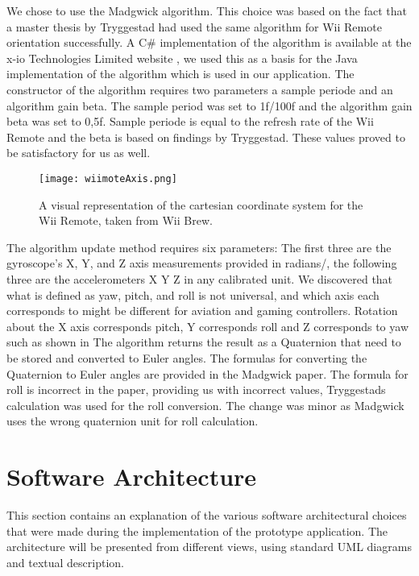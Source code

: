 We chose to use the Madgwick algorithm\cite{madgwick}. This choice was based on the fact that a master thesis by Tryggestad\cite{Tryggestad} had used the same algorithm for Wii Remote orientation successfully. A C\# implementation of the algorithm is available at the x-io Technologies Limited website \cite{opensourceMadgwick}, we used this as a basis for the Java implementation of the algorithm which is used in our application. The constructor of the algorithm requires two parameters a sample periode and an algorithm gain beta. The sample period was set to 1f/100f and the algorithm gain beta was set to 0,5f. Sample periode is equal to the refresh rate of the Wii Remote and the beta is based on findings by Tryggestad. These values proved to be satisfactory for us as well.

\begin{figure}[h!]
  \centering
    \texttt{[image: wiimoteAxis.png]}
    \caption{\footnotesize A visual representation of the cartesian coordinate system for the Wii Remote, taken from Wii Brew\cite{wiiBrew}.}
\end{figure}


The algorithm update method requires six parameters: The first three are the gyroscope's X, Y, and Z axis measurements provided in radians/, the following three are the accelerometers X Y Z in any calibrated unit. We discovered that what is defined as yaw, pitch, and roll is not universal, and which axis each corresponds to might be different for aviation and gaming controllers. Rotation about the X axis corresponds pitch, Y corresponds roll and Z corresponds to yaw such as shown in %
The algorithm returns the result as a Quaternion that need to be stored and converted to Euler angles. The formulas for converting the Quaternion to Euler angles are provided in the Madgwick paper. The formula for roll is incorrect in the paper, providing us with incorrect values, Tryggestads calculation was used for the roll conversion. The change was minor as Madgwick uses the wrong quaternion unit for roll calculation.


\section{Software Architecture}
This section contains an explanation of the various software architectural choices that were made during the implementation of the prototype application. The architecture will be presented from different views, using standard UML diagrams and textual description.

